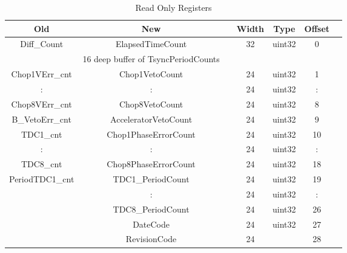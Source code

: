 \begin{table}[h]
  \begin{center}
    \begin{tabular}{c | c | c | c | c | c | c}
    Old & New & & Width & Type & Offset & \\
    \hline
    Diff\_Count & ElapsedTimeCount & & 32 & uint32 & 0 & \\
    & 16 deep buffer of TsyncPeriodCounts & & & & & \\
    Chop1VErr\_cnt & Chop1VetoCount & & 24 & uint32 & 1 & \\
    : & : & & 24 & uint32 & : & \\
    Chop8VErr\_cnt & Chop8VetoCount & & 24 & uint32 & 8 & \\
    B\_VetoErr\_cnt & AcceleratorVetoCount & & 24 & uint32 & 9 & \\
    TDC1\_cnt & Chop1PhaseErrorCount & & 24 & uint32 & 10 & \\
    : & : & & 24 & uint32 & : & \\
    TDC8\_cnt & Chop8PhaseErrorCount & & 24 & uint32 & 18 & \\
    PeriodTDC1\_cnt & TDC1\_PeriodCount & & 24 & uint32 & 19 & \\
    & : & & 24 & uint32 & : & \\
    & TDC8\_PeriodCount & & 24 & uint32 & 26 & \\
    & DateCode & & 24 & uint32 & 27 & \\
    & RevisionCode & & 24 & & 28 & \\
    \end{tabular}
  \end{center}
  \caption {Read Only Registers}
  \label{table:Read_Only_Registers}
\end{table}



